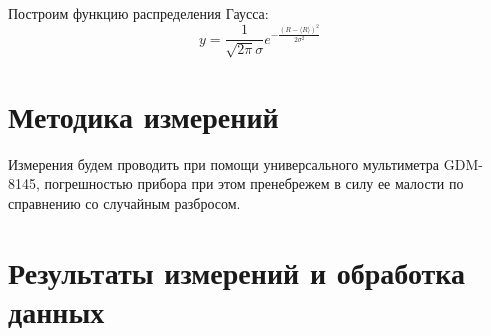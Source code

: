 \documentclass[12pt]{article}
\begin{document}
    \par Построим функцию распределения Гаусса:
    \begin{equation}
        y = \frac{1}{\sqrt{2\pi}\sigma}e^{-\frac{(R - \langle R\rangle)^2}{2\sigma^2}}
    \end{equation}

    \section{Методика измерений}
    Измерения будем проводить при помощи универсального мультиметра GDM-8145, погрешностью
    прибора при этом пренебрежем в силу ее малости по справнению со случайным разбросом.

    \section{Результаты измерений и обработка данных}
    
\end{document}
